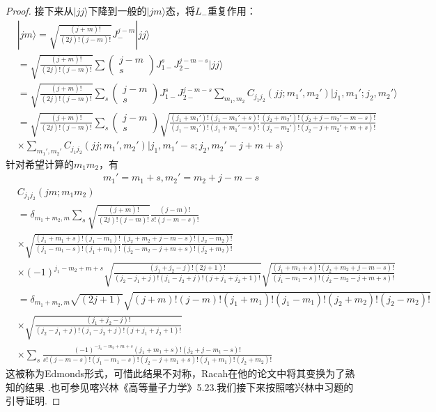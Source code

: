 \begin{proof}
接下来从$|jj\rangle$下降到一般的$|jm\rangle$态，将$L_{-}$重复作用：
\begin{align*}
    &|jm\rangle = \sqrt{\frac{(j+m)!}{(2j)!(j-m)!}}J_{-}^{j-m}|jj\rangle\\
&= \sqrt{\frac{(j+m)!}{(2j)!(j-m)!}}\sum\left(\begin{matrix}j-m\\ s\end{matrix}\right)J_{1-}^{s} J_{2-}^{j-m-s}|jj\rangle\\
&= \sqrt{\frac{(j+m)!}{(2j)!(j-m)!}}\sum_s\left(\begin{matrix}j-m\\ s\end{matrix}\right)J_{1-}^{s} J_{2-}^{j-m-s}\sum_{m_1,m_2} C_{j_1j_2}(j j;m_1',m_2') |j_1,m_1';j_2,m_2'\rangle\\
&= \sqrt{\frac{(j+m)!}{(2j)!(j-m)!}}\sum_s\left(\begin{matrix}j-m\\ s\end{matrix}\right)\sqrt{\frac{(j_1 + m_1')!(j_1 -m_1' +s)!}{(j_1 - m_1')!(j_1 +m_1'-s)!}\frac{(j_2 + m_2')!(j_2+j-m_2'-m-s)!}{(j_2-m_2')!(j_2 - j +m_2'+m+s)!}} \\
&\times\sum_{m_1',m_2'} C_{j_1j_2}(j j;m_1',m_2')|j_1,m_1'-s;j_2,m_2'-j+m+s\rangle
\end{align*}
针对希望计算的$m_1 m_2$，有
\begin{align*}
    m_1' = m_1+s, m_2' = m_2+j-m-s
\end{align*}
\begin{align*}
    &C_{j_1 j_2}(jm;m_1m_2)\\
    &= \delta_{m_1+m_2,m}\sum_{s} \sqrt{\frac{(j+m)!}{(2j)!(j-m)!}}\frac{(j-m)!}{s!(j - m - s)!}\\
    &\times \sqrt{\frac{(j_1 + m_1 + s)!(j_1 -m_1)!}{(j_1 - m_1-s)!(j_1 +m_1)!}\frac{(j_2 + m_2+j-m-s)!(j_2-m_2)!}{(j_2-m_2-j+m+s)!(j_2+m_2)!}}\\
    &\times (-1)^{j_1 - m_2+m+s}\sqrt{\frac{(j_1+j_2-j)!(2j+1)!}{(j_2-j_1+j)!(j_1-j_2 + j)!(j+j_1+j_2+1)!}}\sqrt{\frac{(j_1+m_1+s)!(j_2+m_2+j-m-s)!}{(j_1-m_1-s)!(j_2-m_2-j+m+s)!}}\\
    &= \delta_{m_1+m_2,m} \sqrt{(2j+1)}\sqrt{(j+m)!(j-m)!(j_1+m_1)!(j_1-m_1)!(j_2+m_2)!(j_2-m_2)!}\\
    &\times \sqrt{\frac{(j_1+j_2-j)!}{(j_2-j_1+j)!(j_1-j_2 + j)!(j+j_1+j_2+1)!}}\\
    &\times \sum_{s} \frac{(-1)^{-j_1 - m_2+m+s} (j_1 + m_1 + s)!(j_2+j-m_1-s)!}{s!(j - m - s)!(j_1 - m_1-s)!(j_2-j+m_1+s)!(j_1 + m_1)!(j_2 + m_2)!}
\end{align*}
这被称为Edmonds形式，可惜此结果不对称，Racah在他的论文中将其变换为了熟知的结果%
.也可参见喀兴林《高等量子力学》5.23.我们接下来按照喀兴林中习题的引导证明.
\end{proof}
